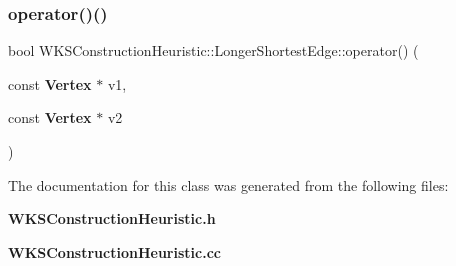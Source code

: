 \subsubsection{operator()()}
{\footnotesize\ttfamily bool W\+K\+S\+Construction\+Heuristic\+::\+Longer\+Shortest\+Edge\+::operator() (\begin{DoxyParamCaption}\item[{const \textbf{ Vertex} $\ast$}]{v1,  }\item[{const \textbf{ Vertex} $\ast$}]{v2 }\end{DoxyParamCaption})}



The documentation for this class was generated from the following files\+:\begin{DoxyCompactItemize}
\item 
\textbf{ W\+K\+S\+Construction\+Heuristic.\+h}\item 
\textbf{ W\+K\+S\+Construction\+Heuristic.\+cc}\end{DoxyCompactItemize}
